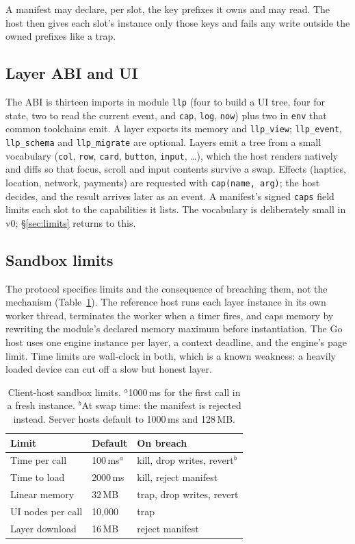 \documentclass[10pt,twocolumn]{article}
\newcommand{\code}[1]{\texttt{#1}}
\newcommand{\ms}{\,ms\xspace}
\begin{document}
A manifest may declare, per slot, the key prefixes it owns and may read. The host then gives each
slot's instance only those keys and fails any write outside the owned prefixes like a trap.

\subsection{Layer ABI and UI}

The ABI is thirteen imports in module \code{llp} (four to build a UI tree, four for state, two to
read the current event, and \code{cap}, \code{log}, \code{now}) plus two in \code{env} that common
toolchains emit. A layer exports its memory and \code{llp\_view}; \code{llp\_event},
\code{llp\_schema} and \code{llp\_migrate} are optional. Layers emit a tree from a small
vocabulary (\code{col}, \code{row}, \code{card}, \code{button}, \code{input}, \ldots), which the
host renders natively and diffs so that focus, scroll and input contents survive a swap. Effects
(haptics, location, network, payments) are requested with \code{cap(name, arg)}; the host decides,
and the result arrives later as an event. A manifest's signed \code{caps} field limits each slot
to the capabilities it lists. The vocabulary is deliberately small in v0; \S\ref{sec:limits}
returns to this.

\subsection{Sandbox limits}
\label{sec:sandbox}

The protocol specifies limits and the consequence of breaching them, not the mechanism
(Table~\ref{tab:limits}). The reference host runs each layer instance in its own worker thread,
terminates the worker when a timer fires, and caps memory by rewriting the module's declared
memory maximum before instantiation. The Go host uses one engine instance per layer, a context
deadline, and the engine's page limit. Time limits are wall-clock in both, which is a known
weakness: a heavily loaded device can cut off a slow but honest layer.

\begin{table}[t]
\centering\footnotesize
\begin{tabular}{@{}lll@{}}
\toprule
Limit & Default & On breach \\
\midrule
Time per call & 100\ms$^{a}$ & kill, drop writes, revert$^{b}$ \\
Time to load & 2000\ms & kill, reject manifest \\
Linear memory & 32\,MB & trap, drop writes, revert \\
UI nodes per call & 10{,}000 & trap \\
Layer download & 16\,MB & reject manifest \\
\bottomrule
\end{tabular}
\caption{Client-host sandbox limits. $^{a}$1000\ms for the first call in a fresh instance.
$^{b}$At swap time: the manifest is rejected instead. Server hosts default to 1000\ms and 128\,MB.}
\label{tab:limits}
\end{table}
\end{document}
